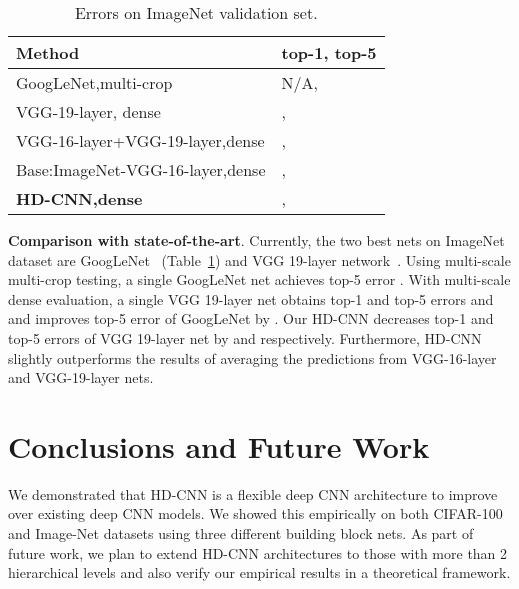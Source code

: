 \documentclass[10pt,twocolumn,letterpaper]{article}
\begin{document}
{\renewcommand{\arraystretch}{1.2}\begin{table}[h]
\vspace{-1.5em}
\caption{Errors on ImageNet validation set.}
\label{tab: imagenet_accuracy} 
\vspace{-1.5em}
\begin{center}
    \begin{tabular}{ p{5.7cm} |p{1.8cm}}
    Method & top-1, top-5 \\ 
    \hline \hline
    GoogLeNet,multi-crop~\cite{szegedy2014going} & N/A,\\ \hline
    VGG-19-layer, dense~\cite{simonyan2014very} & , \\ \hline 
VGG-16-layer+VGG-19-layer,dense & , \\ \hline 
\hline
    Base:ImageNet-VGG-16-layer,dense & , \\ \hline
    \textbf{HD-CNN,dense} &  , \\ \hline   
    \end{tabular}   
\end{center}
\vspace{-1.5em}
\end{table}
}

\noindent \textbf{Comparison with state-of-the-art}. Currently, the two best nets on ImageNet dataset are GoogLeNet~\cite{szegedy2014going} (Table~\ref{tab: imagenet_accuracy}) and VGG 19-layer network~\cite{simonyan2014very}. Using multi-scale multi-crop testing, a single GoogLeNet net achieves top-5 error .
With multi-scale dense evaluation, a single VGG 19-layer net obtains top-1 and top-5 errors  and  and improves top-5 error of GoogLeNet by . Our HD-CNN decreases top-1 and top-5 errors of VGG 19-layer net by  and  respectively. Furthermore, HD-CNN slightly outperforms the results of averaging the predictions from
VGG-16-layer and VGG-19-layer nets.

\section{Conclusions and Future Work}
\label{ref:conclusion}
We demonstrated that HD-CNN is a flexible deep CNN architecture to improve over existing deep CNN models. We showed this empirically on both CIFAR-100 and Image-Net datasets using three different building block nets. As part of future work, we plan to extend HD-CNN architectures to those with more than 2 hierarchical levels and also verify our empirical results in a theoretical framework.








{\small


}
\end{document}
